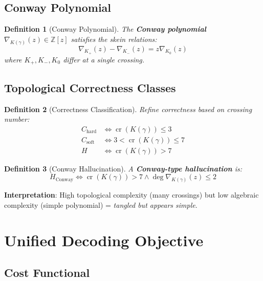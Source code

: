 \documentclass[12pt]{article}
\newtheorem{definition}{Definition}
\begin{document}
\subsection{Conway Polynomial}

\begin{definition}[Conway Polynomial]
The \textbf{Conway polynomial} $\nabla_{K(\gamma)}(z) \in \mathbb{Z}[z]$ satisfies the skein relations:
\begin{equation}
\nabla_{K_+}(z) - \nabla_{K_-}(z) = z \nabla_{K_0}(z)
\end{equation}
where $K_+, K_-, K_0$ differ at a single crossing.
\end{definition}

\subsection{Topological Correctness Classes}

\begin{definition}[Correctness Classification]
Refine correctness based on crossing number:
\begin{align}
C_{\text{hard}} &\iff \operatorname{cr}(K(\gamma)) \le 3 \\
C_{\text{soft}} &\iff 3 < \operatorname{cr}(K(\gamma)) \le 7 \\
H &\iff \operatorname{cr}(K(\gamma)) > 7
\end{align}
\end{definition}

\begin{definition}[Conway Hallucination]
A \textbf{Conway-type hallucination} is:
\begin{equation}
H_{\text{Conway}} \iff \operatorname{cr}(K(\gamma)) > 7 \land \deg \nabla_{K(\gamma)}(z) \le 2
\end{equation}
\end{definition}

\textbf{Interpretation}: High topological complexity (many crossings) but low algebraic complexity (simple polynomial) = \emph{tangled but appears simple}.

\section{Unified Decoding Objective}

\subsection{Cost Functional}
\end{document}
